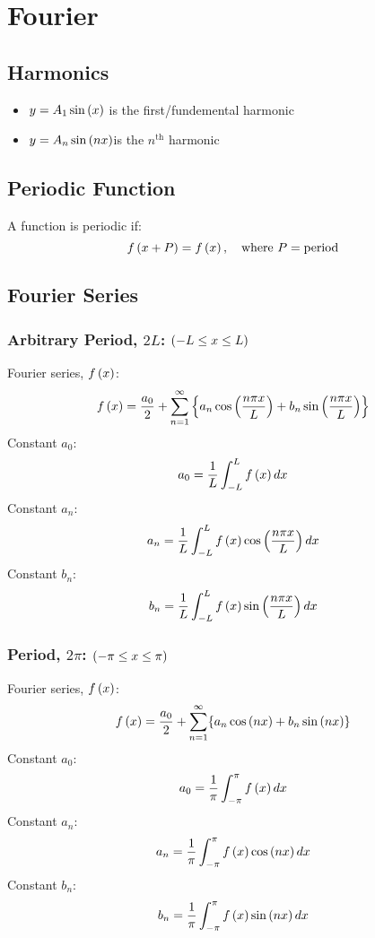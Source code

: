 \section{Fourier}
\subsection{Harmonics}
\begin{itemize}
    \item $y=A_1\sin\left(x\right)$ is the first/fundemental harmonic
    \item $y=A_n\sin\left(nx\right)$is the $n^{\text{th}}$ harmonic
\end{itemize}
\subsection{Periodic Function}
A function is periodic if:
\begin{equation}
    f\left(x+P\right)=f\left(x\right),\quad\text{where }P=\text{period}
\end{equation}
\subsection{Fourier Series}
\subsubsection{Arbitrary Period, $2L$: $\left(-L\leq x\leq L\right)$}
Fourier series, $f\left(x\right)$:
\begin{equation}
    f\left(x\right)=\frac{a_0}{2}+\sum_{n=1}^\infty\left\{a_n\cos\left(\frac{n\pi x}{L}\right)+b_n\sin\left(\frac{n\pi x}{L}\right)\right\}
\end{equation}
Constant $a_0$:
\begin{equation}
    a_0=\frac{1}{L}\int_{-L}^Lf\left(x\right)dx
\end{equation}
Constant $a_n$:
\begin{equation}
    a_n=\frac{1}{L}\int_{-L}^Lf\left(x\right)\cos\left(\frac{n\pi x}{L}\right)dx
\end{equation}
Constant $b_n$:
\begin{equation}
    b_n=\frac{1}{L}\int_{-L}^Lf\left(x\right)\sin\left(\frac{n\pi x}{L}\right)dx
\end{equation}
\subsubsection{Period, $2\pi$: $\left(-\pi\leq x\leq\pi\right)$}
Fourier series, $f\left(x\right)$:
\begin{equation}
    f\left(x\right)=\frac{a_0}{2}+\sum_{n=1}^{\infty}\{a_n\cos\left(nx\right)+b_n\sin\left(nx\right)\}
\end{equation}
Constant $a_0$:
\begin{equation}
    a_0=\frac{1}{\pi}\int_{-\pi}^\pi f\left(x\right)dx
\end{equation}
Constant $a_n$:
\begin{equation}
    a_n=\frac{1}{\pi}\int_{-\pi}^\pi f\left(x\right)\cos\left(nx\right)dx
\end{equation}
Constant $b_n$:
\begin{equation}
    b_n=\frac{1}{\pi}\int_{-\pi}^\pi f\left(x\right)\sin\left(nx\right)dx
\end{equation}
